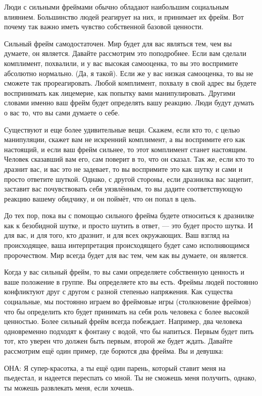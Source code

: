 Люди с сильными фреймами обычно обладают наибольшим социальным влиянием. Большинство людей реагирует на них, и принимает их фрейм. Вот почему так важно иметь чувство собственной базовой ценности.

\RULE  Сильный фрейм самодостаточен. Мир будет для вас являться тем, чем вы думаете, он является. Давайте рассмотрим это поподробнее. Если вам сделали комплимент, похвалили, и у вас высокая самооценка, то вы это воспримите абсолютно нормально. (Да, я такой). Если же у вас низкая самооценка, то вы не сможете так прореагировать. Любой комплимент, похвалу в свой адрес вы будете воспринимать как лицемерие, как попытку вами манипулировать. Другими словами именно ваш фрейм будет определять вашу реакцию. Люди будут думать о вас то, что вы сами думаете о себе.

Существуют и еще более удивительные вещи. Скажем, если кто то, с целью манипуляции, скажет вам не искренний комплимент, а вы воспримите его как настоящий, и если ваш фрейм сильнее, то этот комплимент станет настоящим. Человек сказавший вам его, сам поверит в то, что он сказал. Так же, если кто то дразнит вас, и вас это не задевает, то вы воспримите это как шутку и сами и просто ответите шуткой. Однако, с другой стороны, если дразнилка вас зацепит, заставит вас почувствовать себя уязвлённым, то вы дадите соответствующую реакцию вашему обидчику, и он поймёт, что он попал в цель.

До тех пор, пока вы с помощью сильного фрейма будете относиться к дразнилке как к безобидной шутке, и просто шутить в ответ, --- это будет просто шутка. И для вас, и для того, кто дразнит, и для всех окружающих. Ваш взгляд на происходящее, ваша интерпретация происходящего будет само исполняющимся пророчеством. Мир всегда будет для вас тем, чем как вы думаете, он является.

\RULE  Когда у вас сильный фрейм, то вы сами определяете собственную ценность и ваше положение в группе. Вы определяете кто вы есть. Фреймы людей постоянно конфликтуют друг с другом с разной степенью напряжения. Как существа социальные, мы постоянно играем во фреймовые игры (столкновение фреймов) что бы определить кто будет принимать на себя роль человека с более высокой ценностью. Более сильный фрейм всегда побеждает. Например, два человека одновременно подходят к фонтану с водой, что бы напиться. Первым будет пить тот, кто уверен что должен быть первым, второй же будет ждать. Давайте рассмотрим ещё один пример, где борются два фрейма. Вы и девушка:

ОНА: Я супер-красотка, а ты ещё один парень, который ставит меня на пьедестал, и надеется переспать со мной. Ты не сможешь меня получить, однако, ты можешь развлекать меня, если хочешь.

